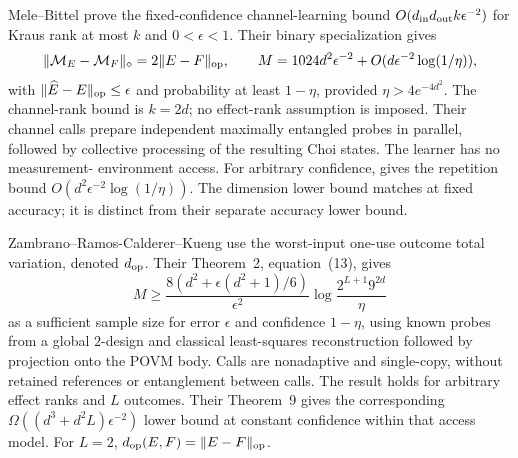 Mele--Bittel \cite[Theorem~I.1]{MB67} prove the
fixed-confidence channel-learning bound
$O(d_{\rm in}d_{\rm out}k\epsilon^{-2})$ for Kraus rank at
most $k$ and $0<\epsilon<1$. Their binary specialization
\cite[Lemmas~III.7--III.8 and Corollary~III.9]{MB67} gives
\[
 \|\mathcal M_E-\mathcal M_F\|_\diamond
     =2\|E-F\|_{\rm op},\qquad
 M=1024d^2\epsilon^{-2}
       +O(d\epsilon^{-2}\log(1/\eta)),
\]
with $\|\widehat E-E\|_{\rm op}\le\epsilon$ and probability
at least $1-\eta$, provided $\eta>4e^{-4d^2}$.
The channel-rank bound is $k=2d$; no effect-rank assumption
is imposed. Their channel calls prepare independent maximally
entangled probes in parallel, followed by collective processing
of the resulting Choi states. The learner has no measurement-
environment access. For arbitrary confidence,
\cite[Remark~III.4]{MB67} gives the repetition bound
$O(d^2\epsilon^{-2}\log(1/\eta))$.
The dimension lower bound matches at fixed accuracy; it is
distinct from their separate accuracy lower bound.

Zambrano--Ramos-Calderer--Kueng \cite[Definition~1]{ZRK76}
use the worst-input one-use outcome total variation, denoted
$d_{\rm op}$. Their Theorem~2, equation~(13), gives
\[
 M\ge
 \frac{8(d^2+\epsilon(d^2+1)/6)}{\epsilon^2}
 \log\frac{2^{L+1}9^{2d}}{\eta}
\]
as a sufficient sample size for error $\epsilon$ and
confidence $1-\eta$, using known probes from a global
$2$-design and classical least-squares reconstruction followed
by projection onto the POVM body. Calls are nonadaptive and
single-copy, without retained references or entanglement
between calls. The result holds for arbitrary effect ranks
and $L$ outcomes. Their Theorem~9 gives the corresponding
$\Omega((d^3+d^2L)\epsilon^{-2})$ lower bound at constant
confidence within that access model. For $L=2$,
$d_{\rm op}(E,F)=\|E-F\|_{\rm op}$.

